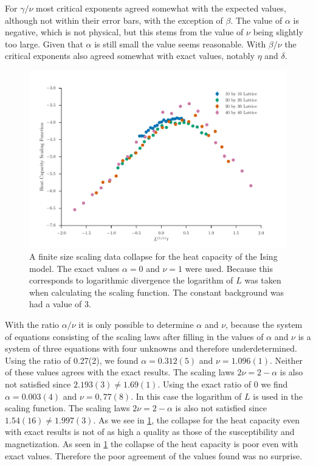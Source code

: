\documentclass[11pt, a4paper]{report} %
\begin{document}
For \(\gamma/\nu\) most critical exponents agreed somewhat with the expected values, although not within their error bars, with the exception of \(\beta\).
The value of \(\alpha\) is negative, which is not physical, but this stems from the value of \(\nu\) being slightly too large.
Given that \(\alpha\) is still small the value seems reasonable.
With \(\beta/\nu\) the critical exponents also agreed somewhat with exact values, notably \(\eta\) and \(\delta\).

\begin{figure}[htb]
	\includegraphics[width=\linewidth]{ising_heat_capacity_data_collapse.pdf}
	\caption{A finite size scaling data collapse for the heat capacity of the Ising model. The exact values \(\alpha=0\) and \(\nu=1\) were used. Because this corresponds to logarithmic divergence the logarithm of \(L\) was taken when calculating the scaling function. The constant background was had a value of 3.}
	\label{fig:ising_heat_capacity_collapse}
\end{figure}

With the ratio \(\alpha / \nu\) it is only possible to determine \(\alpha\) and \(\nu\), because the system of equations consisting of the scaling laws after filling in the values of \(\alpha\) and \(\nu\) is a system of three equations with four unknowns and therefore underdetermined.
Using the ratio of 0.27(2), we found \(\alpha=0.312(5)\) and \(\nu=1.096(1)\).
Neither of these values agrees with the exact results.
The scaling laws \(2\nu = 2-\alpha\) is also not satisfied since \(2.193(3) \neq 1.69(1)\).
Using the exact ratio of 0 we find \(\alpha=0.003(4)\) and \(\nu=0,77(8)\).
In this case the logarithm of \(L\) is used in the scaling function.
The scaling laws \(2\nu = 2-\alpha\) is also not satisfied since \(1.54(16) \neq 1.997(3)\).
As we see in \cref{fig:ising_heat_capacity_collapse}, the collapse for the heat capacity even with exact results is not of as high a quality as those of the susceptibility and magnetization.
As seen in \cref{fig:ising_heat_capacity_collapse} the collapse of the heat capacity is poor even with exact values.
Therefore the poor agreement of the values found was no surprise.
\end{document}
